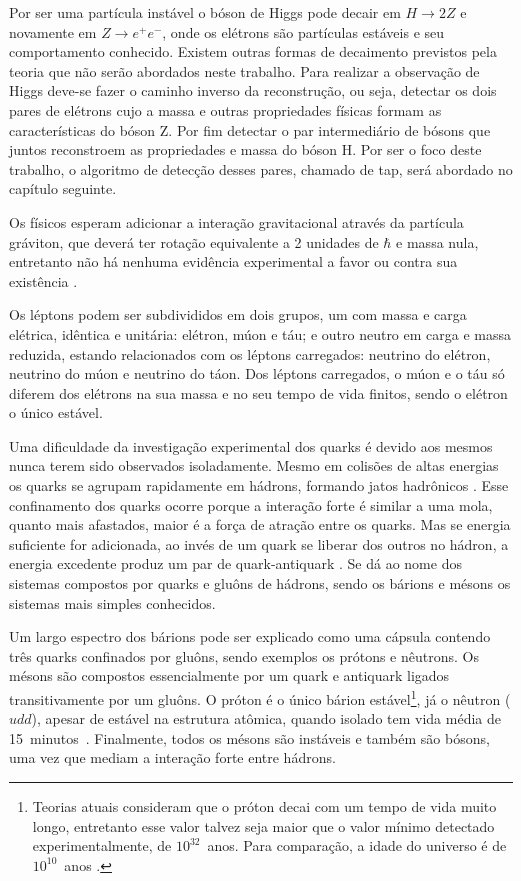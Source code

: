 Por ser uma partícula instável o bóson de Higgs pode decair em $H\to 2Z$ e novamente
em $Z\to e^{+}e^{-}$, onde os elétrons são partículas estáveis e seu comportamento conhecido.
Existem outras formas de decaimento previstos pela teoria que não serão abordados neste
trabalho. Para realizar a observação de Higgs deve-se fazer o caminho inverso da reconstrução, ou seja,
detectar os dois pares de elétrons cujo a massa e outras propriedades físicas formam as
características do bóson Z. Por fim detectar o par intermediário de bósons que juntos reconstroem
as propriedades e massa do bóson H. Por ser o foco deste trabalho, o algoritmo de detecção
desses pares, chamado de   \gls{tap}, será abordado no capítulo seguinte.

Os físicos esperam adicionar a interação gravitacional através da partícula gráviton, que deverá 
ter rotação equivalente a 2 unidades de $\hbar$ e massa nula, entretanto não há nenhuma evidência 
experimental a favor ou contra sua existência \cite{Beiser}.

Os léptons podem ser subdivididos em dois grupos, um com massa e carga elétrica, idêntica e 
unitária: elétron, múon e táu; e outro neutro em carga e massa reduzida, estando relacionados 
com os léptons carregados: neutrino do elétron, neutrino do múon e neutrino do táon. Dos
léptons carregados, o múon e o táu só diferem dos elétrons na sua massa e no seu tempo de vida 
finitos, sendo o elétron o único estável.

Uma dificuldade da investigação experimental dos quarks é devido aos mesmos
nunca terem sido observados isoladamente.  Mesmo em colisões de altas energias os quarks 
se agrupam rapidamente em hádrons, formando jatos hadrônicos \cite{Intro_Nuclear}. Esse 
confinamento dos quarks ocorre porque a interação forte é similar a uma mola, quanto mais 
afastados, maior é a força de atração entre os quarks. Mas se energia suficiente for adicionada,
ao invés de um quark se liberar dos outros no hádron, a energia excedente produz um par de 
quark-antiquark \cite{Beiser}. Se dá ao nome dos sistemas compostos por quarks e gluôns de
hádrons, sendo os bárions e mésons os sistemas mais simples conhecidos. 

Um largo espectro dos bárions pode ser explicado como uma cápsula contendo
três quarks confinados por gluôns, sendo exemplos os prótons e nêutrons. Os mésons
são compostos essencialmente por um quark e antiquark ligados transitivamente por um gluôns. 
O próton é o único bárion estável\footnote{Teorias atuais
consideram que o próton decai com um tempo de vida muito longo, entretanto esse valor talvez seja 
maior que o valor mínimo detectado experimentalmente, de $10^{32}$~anos.  Para comparação, a 
idade do universo é de $10^{10}$~anos \cite{Beiser}.}, já o nêutron ($udd$), apesar de estável 
na estrutura atômica, quando isolado tem vida média de 15~minutos~\cite{Intro_Standard}. Finalmente, 
todos os mésons são instáveis e também são bósons, uma vez que mediam a interação
forte entre hádrons.

